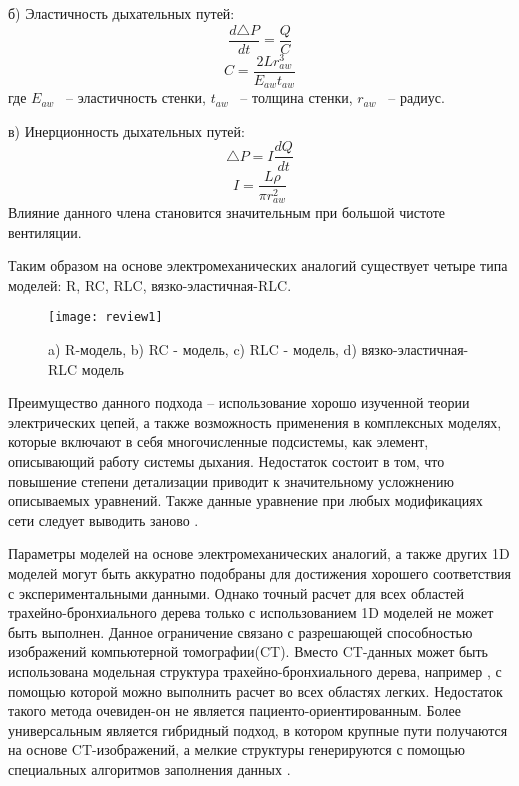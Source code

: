 б) Эластичность дыхательных путей:
\begin{equation}
\frac{d\triangle P}{dt}=\frac{Q}{C}
\end{equation}
\begin{equation}
C=\frac{2Lr_{aw}^{3}}{E_{aw}t_{aw}}
\end{equation}
где $E_{aw}$ ~-- эластичность стенки, $t_{aw}$ ~-- толщина стенки, $r_{aw}$ ~-- радиус.

в) Инерционность дыхательных путей:
\begin{equation}
\triangle P=I\frac{dQ}{dt}
\end{equation}
\begin{equation}
I=\frac{L\rho}{\pi r_{aw}^{2}}
\end{equation}
Влияние данного члена становится значительным при большой чистоте вентиляции.

Таким образом на основе электромеханических аналогий существует четыре типа моделей: R, RC, RLC, вязко-эластичная-RLC.
\begin{figure}[!ht]
	\centering
	\texttt{[image: review1]}
	\caption{a) R-модель, b) RC - модель, c) RLC - модель, d) вязко-эластичная-RLC модель } 
\end{figure}
Преимущество данного подхода – использование хорошо изученной теории электрических цепей, а также возможность применения в комплексных моделях, которые включают в себя многочисленные подсистемы, как элемент, описывающий работу системы дыхания.   Недостаток состоит в том, что повышение степени детализации приводит к значительному усложнению описываемых уравнений. Также данные уравнение при любых модификациях сети следует выводить заново \cite{Bates2009}.    

Параметры моделей на основе электромеханических аналогий, а также других 1D моделей \cite{Suki1993, Lutchen1996,Gillis1999,Nucci2002} могут быть аккуратно подобраны для достижения хорошего соответствия с экспериментальными данными. Однако точный расчет для всех областей трахейно-бронхиального дерева только с использованием 1D моделей не может быть выполнен. Данное ограничение связано с разрешающей способностью изображений компьютерной томографии(CT). Вместо CT-данных может быть использована модельная структура трахейно-бронхиального дерева, например \cite{Horsfield1971,Weibel1963}, с помощью которой можно выполнить расчет во всех областях легких. Недостаток такого метода очевиден-он не является пациенто-ориентированным. Более универсальным является гибридный подход, в котором крупные пути получаются на основе CT-изображений, а мелкие структуры генерируются с помощью специальных алгоритмов заполнения данных \cite{Tawhai2000,Tawhai2010,Tawhai2006,Lin2009}. 

